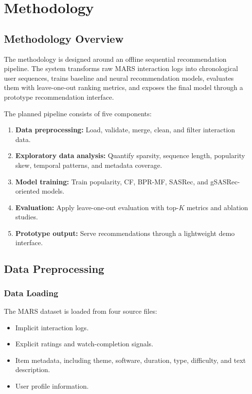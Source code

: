 
\section{Methodology}

\subsection{Methodology Overview}

The methodology is designed around an offline sequential recommendation pipeline. The system transforms raw MARS interaction logs into chronological user sequences, trains baseline and neural recommendation models, evaluates them with leave-one-out ranking metrics, and exposes the final model through a prototype recommendation interface.

The planned pipeline consists of five components:

\begin{enumerate}
    \item \textbf{Data preprocessing:} Load, validate, merge, clean, and filter interaction data.
    \item \textbf{Exploratory data analysis:} Quantify sparsity, sequence length, popularity skew, temporal patterns, and metadata coverage.
    \item \textbf{Model training:} Train popularity, CF, BPR-MF, SASRec, and gSASRec-oriented models.
    \item \textbf{Evaluation:} Apply leave-one-out evaluation with top-$K$ metrics and ablation studies.
    \item \textbf{Prototype output:} Serve recommendations through a lightweight demo interface.
\end{enumerate}

\subsection{Data Preprocessing}

\subsubsection{Data Loading}

The MARS dataset is loaded from four source files:

\begin{itemize}
    \item Implicit interaction logs.
    \item Explicit ratings and watch-completion signals.
    \item Item metadata, including theme, software, duration, type, difficulty, and text description.
    \item User profile information.
\end{itemize}

